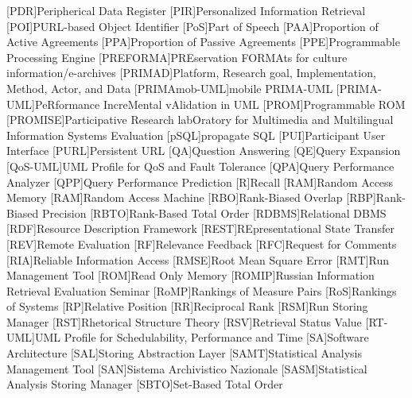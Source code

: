 [PDR]{Peripherical Data Register}
[PIR]{Personalized Information Retrieval}
[POI]{\acs{PURL}-based Object Identifier}
[PoS]{Part of Speech}
[PAA]{Proportion of Active Agreements}
[PPA]{Proportion of Passive Agreements}
[PPE]{Programmable Processing Engine}
[PREFORMA]{PREservation FORMAts for culture information/e-archives}
[PRIMAD]{Platform, Research goal, Implementation, Method, Actor, and Data}
[PRIMAmob-UML]{mobile \acs{PRIMA-UML}}
[PRIMA-UML]{PeRformance IncreMental vAlidation in \acs{UML}}
[PROM]{Programmable \acs{ROM}}
[PROMISE]{Participative Research labOratory  for Multimedia and Multilingual Information Systems Evaluation}
[pSQL]{propagate \acs{SQL}}
[PUI]{Participant User Interface}
[PURL]{Persistent \acs{URL}}
[QA]{Question Answering}
[QE]{Query Expansion}
[QoS-UML]{\acs{UML} Profile for QoS and Fault Tolerance}
[QPA]{Query Performance Analyzer}
[QPP]{Query Performance Prediction}
[R]{Recall}
[RAM]{Random Access Memory}
[RAM]{Random Access Machine}
[RBO]{Rank-Biased Overlap}
[RBP]{Rank-Biased Precision}
[RBTO]{Rank-Based Total Order}
[RDBMS]{Relational \acs{DBMS}}
[RDF]{Resource Description Framework}
[REST]{REpresentational State Transfer}
[REV]{Remote Evaluation}
[RF]{Relevance Feedback}
[RFC]{Request for Comments}
[RIA]{Reliable Information Access}
[RMSE]{Root Mean Square Error}
[RMT]{Run Management Tool}
[ROM]{Read Only Memory}
[ROMIP]{Russian Information Retrieval Evaluation Seminar}
[RoMP]{Rankings of Measure Pairs}
[RoS]{Rankings of Systems}
[RP]{Relative Position}
[RR]{Reciprocal Rank}
[RSM]{Run Storing Manager}
[RST]{Rhetorical Structure Theory}
[RSV]{Retrieval Status Value}
[RT-UML]{\acs{UML} Profile for Schedulability, Performance and Time}
[SA]{Software Architecture}
[SAL]{Storing Abstraction Layer}
[SAMT]{Statistical Analysis Management Tool}
[SAN]{Sistema Archivistico Nazionale}
[SASM]{Statistical Analysis Storing Manager}
[SBTO]{Set-Based Total Order}
